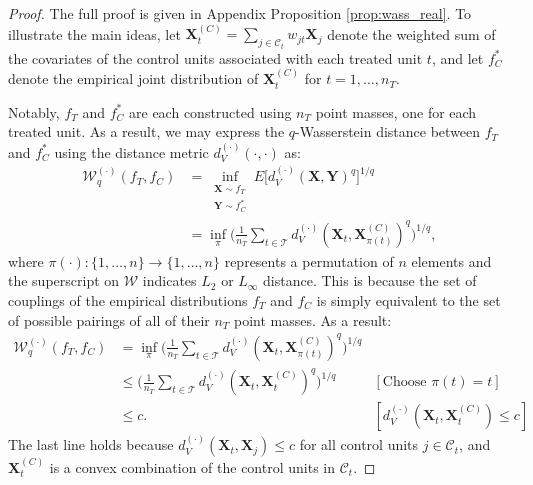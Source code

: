 \documentclass{article}
\newcommand{\bX}{\mathbf{X}}
\newcommand{\Xt}{\mathbf{X}_t}
\newcommand{\Xj}{\mathbf{X}_j}
\newcommand{\Ct}{\mathcal{C}_{t}}
\begin{document}
\begin{proof}
    The full proof is given in Appendix Proposition \ref{prop:wass_real}.
    To illustrate the main ideas, let $\bX_t^{(C)} = \sum_{j \in \Ct} w_{jt} \Xj$ denote the weighted sum of the covariates of the control units associated with each treated unit $t$,
    and let $f_C^*$ denote the empirical joint distribution of $\bX_t^{(C)}$ for $t = 1, \dots, n_T$.

    Notably, $f_T$ and $f_C^*$ are each constructed using $n_T$ point masses, one for each treated unit.
    As a result, we may express the $q$-Wasserstein distance between $f_T$ and $f_C^*$ using the distance metric $d^{(\cdot)}_V(\cdot, \cdot)$ as:
    \begin{align*}
        \mathcal{W}^{(\cdot)}_q(f_T, f_C) 
        &= \inf_{\substack{\bX \sim f_T \\ \mathbf{Y} \sim f_C^*}} E\big[ d_V^{(\cdot)}(\bX, \mathbf{Y})^q \big]^{1/q} \\
        &= \inf_{\pi} \Big( \frac{1}{n_T} \sum_{t \in \mathcal{T}} d^{(\cdot)}_V(\bX_t, \bX^{(C)}_{\pi(t)})^q \Big)^{1/q},
    \end{align*}
    where $\pi(\cdot): \{1, \dots, n\} \to \{1, \dots, n\}$ represents a permutation of $n$ elements and the superscript on $\mathcal{W}$ indicates $L_2$ or $L_\infty$ distance.
    This is because the set of couplings of the empirical distributions $f_T$ and $f_C$ is simply equivalent to the set of possible pairings of all of their $n_T$ point masses.
    As a result:
    \begin{align*}
        \mathcal{W}^{(\cdot)}_q(f_T, f_C) &=
        \inf_{\pi} \big( \frac{1}{n_T} \sum_{t \in \mathcal{T}} d^{(\cdot)}_V(\bX_t, \bX^{(C)}_{\pi(t)})^q \big)^{1/q} \\
        &\leq \big( \frac{1}{n_T} \sum_{t \in \mathcal{T}} d^{(\cdot)}_V(\bX_t, \bX^{(C)}_{t})^q \big)^{1/q} 
            &[\text{Choose } \pi(t)=t] \\
        &\leq c.
            &[d^{(\cdot)}_V(\bX_t, \bX^{(C)}_{t}) \leq c]
    \end{align*}
    The last line holds because $d^{(\cdot)}_V(\Xt, \Xj) \leq c$ for all control units $j \in \Ct$, and $\bX_t^{(C)}$ is a convex combination of the control units in $\Ct$.
\end{proof}
\end{document}
